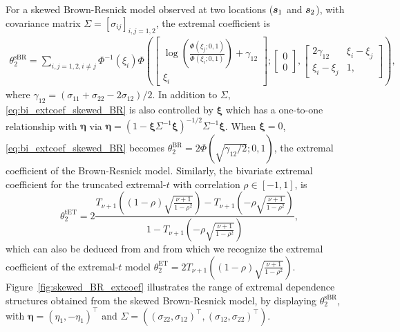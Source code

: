 \documentclass[12pt]{article}
\begin{document}
%
For a skewed Brown-Resnick model observed at two locations (${\boldsymbol{s}}_1$ and ${\boldsymbol{s}}_2$), with covariance matrix $\Sigma = \left[ \sigma_{ij}\right]_{i,j=1,2}$, the extremal coefficient is 
%
\begin{align}
\label{eq:bi_extcoef_skewed_BR}
\theta_{2}^{\textrm{sBR}} = \sum_{i,j=1,2,i\neq j}\Phi^{-1}(\xi_i)
\Phi\left(
\begin{bmatrix} 
\log\left(\frac{\Phi(\xi_j;0,1)}{\Phi(\xi_i;0,1)}\right) + \gamma_{12} \\ 
\xi_i 
\end{bmatrix};
\begin{bmatrix}
0 \\ 0
\end{bmatrix},
\begin{bmatrix}
2\gamma_{12} & \xi_i - \xi_j \\ \xi_i - \xi_j & 1,
\end{bmatrix}\right), 
\end{align}
%
where $\gamma_{12} = (\sigma_{11} + \sigma_{22} -2\sigma_{12})/2$. In addition to $\Sigma$, \eqref{eq:bi_extcoef_skewed_BR} is also controlled by $\bm\xi$ which has a one-to-one relationship with $\bm\eta$ via $\bm\eta = (1-\bm \xi \Sigma^{-1} \bm\xi)^{-1/2}\Sigma^{-1}\bm\xi$.
When $\bm \xi = 0$, \eqref{eq:bi_extcoef_skewed_BR} becomes $\theta_{2}^{\textrm{BR}} = 2 \Phi(\sqrt{\gamma_{12}/2}; 0, 1)$, the extremal coefficient of the Brown-Resnick model.
Similarly, the bivariate extremal coefficient for the truncated extremal-$t$ with correlation $\rho \in [-1,1]$, is
%
\begin{equation}
\label{eq:bi_extcoef_trunc_ET}  
\theta_2^{\textrm{tET}} = 2 \frac{T_{\nu+1}\left( (1-\rho) \sqrt{\frac{\nu+1}{1-\rho^2}} \right) - T_{\nu+1}\left( -\rho \sqrt{\frac{\nu+1}{1-\rho^2}} \right)}{1-T_{\nu+1}\left( -\rho \sqrt{\frac{\nu+1}{1-\rho^2}} \right)}, 
\end{equation}
%
which can also be deduced from \citet{Beranger.Podoan.Sisson:2021} and from which we recognize the extremal coefficient of the extremal-$t$ model $\theta_2^{\textrm{ET}} = 2 T_{\nu+1}\left( (1-\rho) \sqrt{\frac{\nu+1}{1-\rho^2}} \right)$. 
%
Figure~\ref{fig:skewed_BR_extcoef} illustrates the range of extremal dependence structures obtained from the skewed Brown-Resnick model, by displaying $\theta_2^{\textrm{sBR}}$, with $\bm\eta = (\eta_1,-\eta_1)^\top$ and $\Sigma = ((\sigma_{22},\sigma_{12})^\top,(\sigma_{12},\sigma_{22})^\top)$. 
\end{document}
